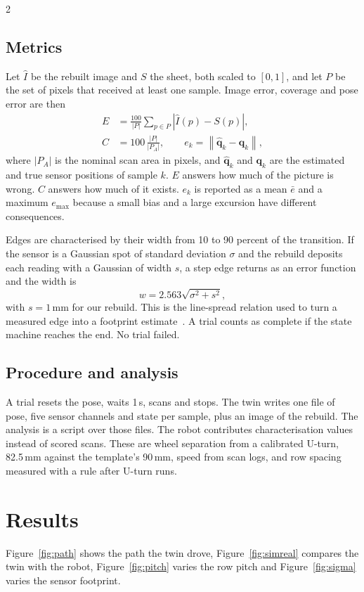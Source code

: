 \documentclass[a4paper,10pt]{article}
\begin{document}
\begin{multicols*}{2}
\subsection*{Metrics}
Let $\hat{I}$ be the rebuilt image and $S$ the sheet, both scaled to $[0,1]$, and
let $P$ be the set of pixels that received at least one sample. Image error,
coverage and pose error are then
\begin{align}
  E&=\frac{100}{|P|}\sum_{p\in P}\left|\hat{I}(p)-S(p)\right|,\label{eq:metrics}\\
  C&=100\,\frac{|P|}{|P_A|},\qquad
  e_k=\left\|\hat{\mathbf{q}}_k-\mathbf{q}_k\right\|,\nonumber
\end{align}
where $|P_A|$ is the nominal scan area in pixels, and $\hat{\mathbf{q}}_k$ and
$\mathbf{q}_k$ are the estimated and true sensor positions of sample $k$. $E$
answers how much of the picture is wrong. $C$ answers how much of it exists.
$e_k$ is reported as a mean $\bar{e}$ and a maximum $e_{\max}$ because a small
bias and a large excursion have different consequences.

Edges are characterised by their width from 10 to 90 percent of the transition.
If the sensor is a Gaussian spot of standard deviation $\sigma$ and the rebuild
deposits each reading with a Gaussian of width $s$, a step edge returns as an
error function and the width is
\begin{equation}
  w = 2.563\sqrt{\sigma^2+s^2} ,
  \label{eq:edge}
\end{equation}
with $s=1$\,mm for our rebuild. This is the line-spread relation used to turn a
measured edge into a footprint estimate~\cite{boreman}. A trial counts as complete if the state machine reaches the end.
No trial failed.

\subsection*{Procedure and analysis}
A trial resets the pose, waits 1\,s, scans and stops. The twin writes one file
of pose, five sensor channels and state per sample, plus an image of the
rebuild. The analysis is a script over those files. The robot contributes
characterisation values instead of scored scans. These are wheel separation from
a calibrated U-turn, 82.5\,mm against the template's 90\,mm, speed from scan
logs, and row spacing measured with a rule after U-turn runs.

\section{Results}
Figure~\ref{fig:path} shows the path the twin drove, Figure~\ref{fig:simreal}
compares the twin with the robot, Figure~\ref{fig:pitch} varies the row pitch and
Figure~\ref{fig:sigma} varies the sensor footprint.


\end{multicols*}
\end{document}
